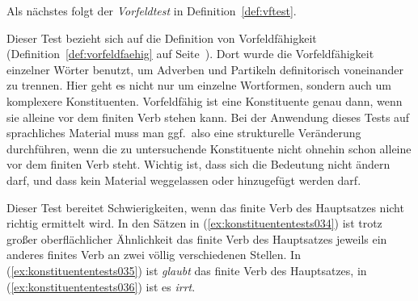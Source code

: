 Als nächstes folgt der \textit{Vorfeldtest} in Definition~\ref{def:vftest}.


Dieser Test bezieht sich auf die Definition von Vorfeldfähigkeit (Definition~\ref{def:vorfeldfaehig} auf Seite~\pageref{def:vorfeldfaehig}).
Dort wurde die Vorfeldfähigkeit einzelner Wörter benutzt, um Adverben und Partikeln definitorisch voneinander zu trennen.
Hier geht es nicht nur um einzelne Wortformen, sondern auch um komplexere Konstituenten.
Vorfeldfähig ist eine Konstituente genau dann, wenn sie alleine vor dem finiten Verb stehen kann.
Bei der Anwendung dieses Tests auf sprachliches Material muss man ggf.\ also eine strukturelle Veränderung durchführen, wenn die zu untersuchende Konstituente nicht ohnehin schon alleine vor dem finiten Verb steht.
Wichtig ist, dass sich die Bedeutung nicht ändern darf, und dass kein Material weggelassen oder hinzugefügt werden darf.

\begin{exe}
  \ex\label{ex:konstituententests029}
  \begin{xlist}
  \end{xlist}
\end{exe}

Dieser Test bereitet Schwierigkeiten, wenn das finite Verb des Hauptsatzes nicht richtig ermittelt wird.
In den Sätzen in (\ref{ex:konstituententests034}) ist trotz großer oberflächlicher Ähnlichkeit das finite Verb des Hauptsatzes jeweils ein anderes finites Verb an zwei völlig verschiedenen Stellen.
In (\ref{ex:konstituententests035}) ist \textit{glaubt} das finite Verb des Hauptsatzes, in (\ref{ex:konstituententests036}) ist es \textit{irrt}.

